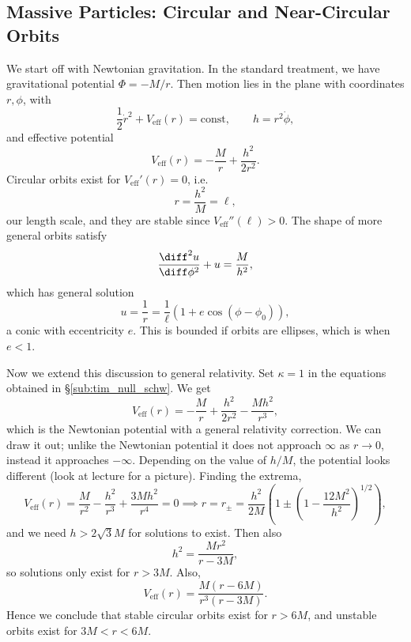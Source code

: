 \documentclass[12pt]{article}
\begin{document}
\subsection{Massive Particles: Circular and Near-Circular Orbits}
\label{sub:mas_circ_near}

We start off with Newtonian gravitation. In the standard treatment, we have gravitational potential $\Phi = -M/r$. Then motion lies in the plane with coordinates $r, \phi$, with
\[
	\frac{1}{2} \dot r^2 + V_{\mathrm{eff}}(r) = \text{const}, \qquad h = r^2 \dot \phi,
\]
and effective potential
\[
V_{\mathrm{eff}}(r) = - \frac{M}{r} + \frac{h^2}{2r^2}.
\]
Circular orbits exist for $V_{\mathrm{eff}}'(r) = 0$, i.e.
\[
r = \frac{h^2}{M} = \ell,
\]
our length scale, and they are stable since $V_{\mathrm{eff}}''(\ell) > 0$. The shape of more general orbits satisfy
\[
\frac{\diff^2 u}{\diff \phi^2} + u = \frac{M}{h^2},
\]
which has general solution
\[
u = \frac{1}{r} = \frac{1}{\ell }(1 + e \cos(\phi - \phi_0)),
\]
a conic with eccentricity $e$. This is bounded if orbits are ellipses, which is when $e < 1$.

Now we extend this discussion to general relativity. Set $\kappa = 1$ in the equations obtained in \S\ref{sub:tim_null_schw}. We get
\[
V_{\mathrm{eff}}(r) = - \frac{M}{r} + \frac{h^2}{2r^2} - \frac{Mh^2}{r^3},
\]
which is the Newtonian potential with a general relativity correction. We can draw it out; unlike the Newtonian potential it does not approach $\infty$ as $r \to 0$, instead it approaches $-\infty$. Depending on the value of $h/M$, the potential looks different (look at lecture for a picture). Finding the extrema,
\[
V_{\mathrm{eff}}(r) = \frac{M}{r^2} - \frac{h^2}{r^3} + \frac{3Mh^2}{r^4} = 0 \implies r = r_{\pm} = \frac{h^2}{2M} \left( 1 \pm \left(1 - \frac{12M^2}{h^2} \right)^{1/2} \right),
\]
and we need $h > 2 \sqrt 3 M$ for solutions to exist. Then also
\[
h^2 = \frac{Mr^2}{r - 3M},
\]
so solutions only exist for $r > 3M$. Also,
\[
V_{\mathrm{eff}}(r) = \frac{M(r - 6M)}{r^3(r - 3M)}.
\]
Hence we conclude that stable circular orbits exist for $r > 6M$, and unstable orbits exist for $3M < r < 6M$.

\end{document}
